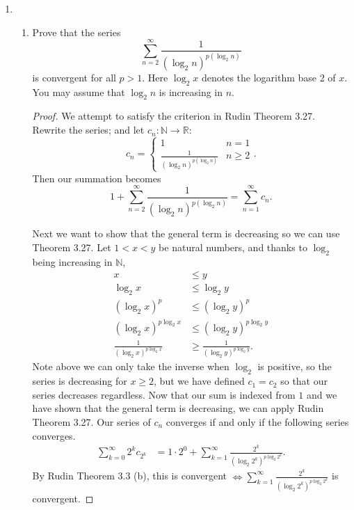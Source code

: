 \documentclass{article}
\begin{document}
\begin{enumerate} 
\item \begin{enumerate}
        \item Prove that the series $$\sum_{n=2}^\infty\frac1{(\log_2n)^{p(\log_2n)}}$$
        is convergent for all $p>1.$ Here $\log_2x$ denotes the logarithm base 2 of $x.$ You may assume
        that $\log_2n$ is increasing in $n.$

        \begin{proof} 
            We attempt to satisfy the criterion in Rudin Theorem 3.27. Rewrite the series; 
            and let $c_n:\mathbb{N}\to \mathbb{R}$:
            \[
            c_n=\begin{cases}
                1&n=1\\
                \frac1{(\log_2n)^{p(\log_2n)}}&n\ge 2
            \end{cases}
            .\] 
            Then our summation becomes
            \[
                1+\sum_{n=2}^\infty\frac1{(\log_2n)^{p(\log_2n)}}=
                 \sum_{n=1}^{\infty} c_n
            .\] 

            Next we want to show that the general term is decreasing so we can use Theorem 3.27. Let $1<x<y$
            be natural numbers, and thanks to $\log_2$ being increasing in $\mathbb{N}$,
            \begin{align*}
                x&\leq y\\
                \log_2 x&\leq\log_2 y\\
                (\log_2 x)^{p}&\leq(\log_2 y)^{p}\\
                (\log_2 x)^{p\log_2 x}&\leq(\log_2 y)^{p\log_2 y}\\
                \frac{1}{(\log_2 x)^{p\log_2 x}}&\geq\frac{1}{(\log_2 y)^{p\log_2 y}}
            .\end{align*}
            Note above we can only take the inverse when $\log_2$ is positive, so the series is decreasing 
            for $x\geq 2$, but we have defined $c_1=c_2$ so that our series decreases regardless.
            Now that our sum is indexed from $1$ and we have shown that the general term is decreasing,
            we can apply Rudin Theorem 3.27. Our series of $c_n$ converges if and only if the following 
            series converges.
            \begin{align*}
                \sum_{k=0}^{\infty} 2^kc_{2^k}
                &= 1\cdot 2^0+  \sum_{k=1}^{\infty} \frac{2^k}{\left(\log_2 2^k\right)^{p\log_2 2^k}} 
            .\end{align*}   
            By Rudin Theorem 3.3 (b), this is convergent $\iff \sum\limits_{k=1}^{\infty} \frac{2^k}{\left(\log_2 2^k\right)^{p\log_2 2^k}} $ is convergent.


\end{proof}
\end{enumerate}
\end{enumerate}
\end{document}
